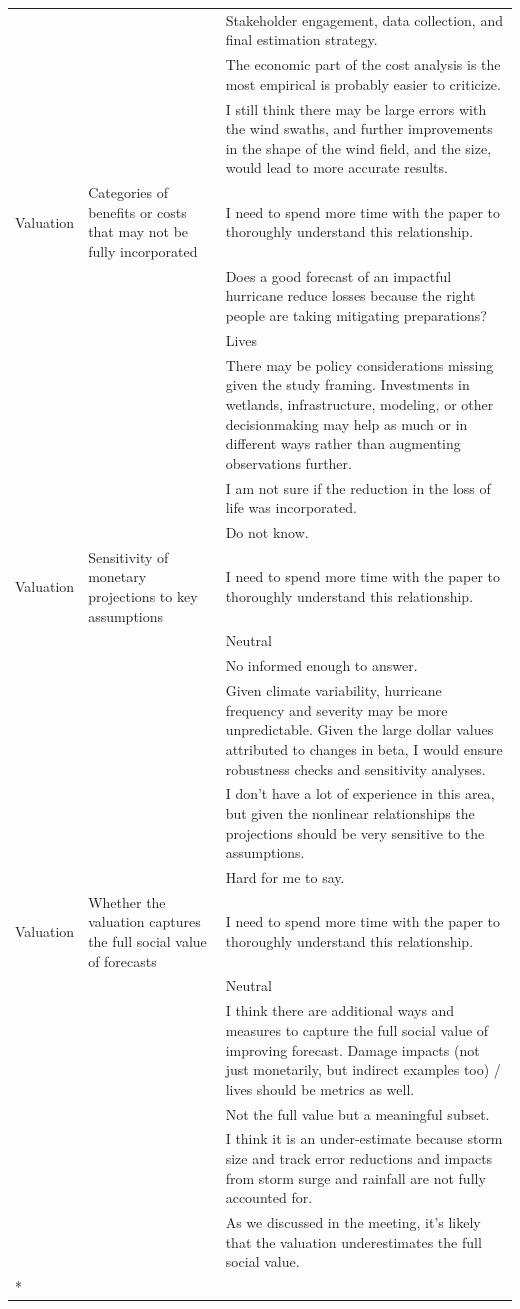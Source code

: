 \begin{longtable}[t]{lp{4.2cm}p{8.2cm}}
\addlinespace
 &  & Stakeholder engagement, data collection, and final estimation strategy.\\
 &  & The economic part of the cost analysis is the most empirical is probably easier to criticize.\\
 &  & I still think there may be large errors with the wind swaths, and further improvements in the shape of the wind field, and the size, would lead to more accurate results.\\
Valuation & Categories of benefits or costs that may not be fully incorporated & I need to spend more time with the paper to thoroughly understand this relationship.\\
 &  & Does a good forecast of an impactful hurricane reduce losses because the right people are taking mitigating preparations?\\
\addlinespace
 &  & Lives\\
 &  & There may be policy considerations missing given the study framing. Investments in wetlands, infrastructure, modeling, or other decisionmaking may help as much or in different ways rather than augmenting observations further.\\
 &  & I am not sure if the reduction in the loss of life was incorporated.\\
 &  & Do not know.\\
Valuation & Sensitivity of monetary projections to key assumptions & I need to spend more time with the paper to thoroughly understand this relationship.\\
\addlinespace
 &  & Neutral\\
 &  & No informed enough to answer.\\
 &  & Given climate variability, hurricane frequency and severity may be more unpredictable. Given the large dollar values attributed to changes in beta, I would ensure robustness checks and sensitivity analyses.\\
 &  & I don't have a lot of experience in this area, but given the nonlinear relationships the projections should be very sensitive to the assumptions.\\
 &  & Hard for me to say.\\
\addlinespace
Valuation & Whether the valuation captures the full social value of forecasts & I need to spend more time with the paper to thoroughly understand this relationship.\\
 &  & Neutral\\
 &  & I think there are additional ways and measures to capture the full social value of improving forecast. Damage impacts (not just monetarily, but indirect examples too) / lives should be metrics as well.\\
 &  & Not the full value but a meaningful subset.\\
 &  & I think it is an under-estimate because storm size and track error reductions and impacts from storm surge and rainfall are not fully accounted for.\\
\addlinespace
 &  & As we discussed in the meeting, it's likely that the valuation underestimates the full social value.\\*
\end{longtable}
\endgroup{}
